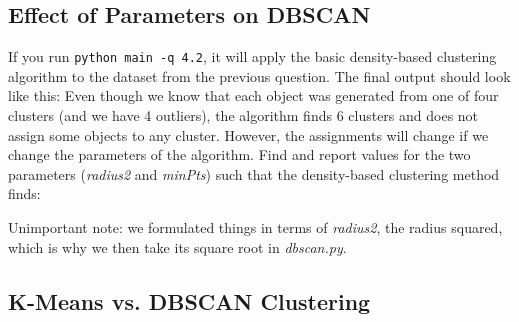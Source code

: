 \documentclass{article}
\begin{document}

\subsection{Effect of Parameters on DBSCAN}

If you run \verb|python main -q 4.2|, it will apply the basic density-based clustering algorithm to the dataset from the previous question. The final output should look like this:
Even though we know that each object was generated from one of four clusters (and we have 4 outliers), the algorithm finds 6 clusters and does not assign some objects to any cluster. However, the assignments will change if we change the parameters of the algorithm. Find and report values for the two parameters (\emph{radius2} and \emph{minPts}) such that the density-based clustering method finds:

Unimportant note: we formulated things in terms of \emph{radius2}, the radius squared, which is why we then take its square root in \emph{dbscan.py}. 


\subsection{K-Means vs. DBSCAN Clustering}
\end{document}
